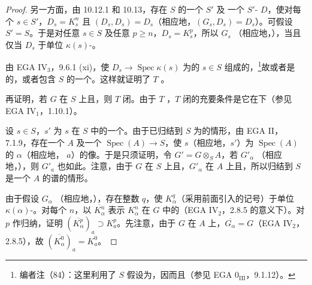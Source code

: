 \begin{proof}
另一方面，由 10.12.1 和 10.13，存在 $S$ 的一个 $S'$ 及
一个 $S'$- $D$，使对每个 $s\in S'$，$D_s=K_s^n$ 且 $(D_s,D_s)=D_s$（相应地，$(G_s,D_s)=D_s$）。可假设 $S'=S$。于是对任意 $s\in S$ 及任意 $p\geq n$，$D_s=K_s^p$，所以 $G_s$ （相应地，），当且仅当 $D_s$ 于单位 $\kappa(s)$-。

由 EGA $\mathrm{IV}_3$，9.6.1 (xi)，使 $D_s\to\operatorname{Spec}\kappa(s)$ 为的 $s\in S$ 组成的，\footnote{编者注（84）：这里利用了 $S$ 假设为，因而且（参见 EGA $0_{\mathrm{III}}$，9.1.12）。}故或者是的，或者包含 $S$ 的一个。这样就证明了 $T$ 。

再证明，若 $G$ 在 $S$ 上且，则 $T$ 闭。由于 $T$ ，$T$ 闭的充要条件是它在下（参见 EGA $\mathrm{IV}_1$，1.10.1）。

设 $s\in S$，$s'$ 为 $s$ 在 $S$ 中的一个。由于已归结到 $S$ 为的情形，由 EGA II，7.1.9，存在一个 $A$ 及一个 $\operatorname{Spec}(A)\to S$，使 $s$（相应地，$s'$）为 $\operatorname{Spec}(A)$ 的 $\alpha$（相应地， $a$）的像。于是只须证明，令 $G'=G\otimes_S A$，若 $G'_\alpha$ （相应地，），则 $G'_a$ 也如此。注意，由于 $G$ 在 $S$ 上且，$G'_\alpha$ 在 $A$ 上且，所以归结到 $S$ 是一个 $A$ 的谱的情形。

由于假设 $G_\alpha$ （相应地，），存在整数 $q$，使 $K_\alpha^q$（采用前面引入的记号）于单位 $\kappa(\alpha)$-。对每个 $n$，以 $\overline{K_\alpha^n}$ 表示 $K_\alpha^n$ 在 $G$ 中的（EGA $\mathrm{IV}_2$，2.8.5 的意义下）。对 $p$ 作归纳，证明 $(\overline{K_\alpha^p})_a\supset K_a^p$。先注意，由于 $G$ 在 $A$ 上，$\overline{G_\alpha}=G$（EGA $\mathrm{IV}_2$，2.8.5），故 $(\overline{K_\alpha^0})_a=K_a^0$。


\end{proof}
